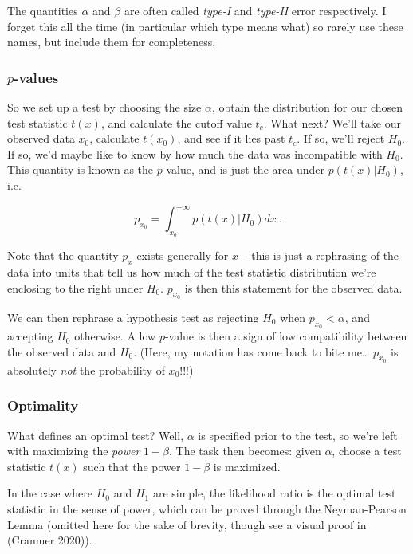 \documentclass[
  11pt,
  numbers=noendperiod]{book}
\begin{document}
The quantities \(\alpha\) and \(\beta\) are often called \emph{type-I}
and \emph{type-II} error respectively. I forget this all the time (in
particular which type means what) so rarely use these names, but include
them for completeness.

\hypertarget{p-values}{%
\subsubsection*{\texorpdfstring{\(p\)-values}{p-values}}\label{p-values}}

So we set up a test by choosing the size \(\alpha\), obtain the
distribution for our chosen test statistic \(t(x)\), and calculate the
cutoff value \(t_c\). What next? We'll take our observed data \(x_0\),
calculate \(t(x_0)\), and see if it lies past \(t_c\). If so, we'll
reject \(H_0\). If so, we'd maybe like to know by how much the data was
incompatible with \(H_0\). This quantity is known as the \(p\)-value,
and is just the area under \(p(t(x) | H_0)\), i.e.

\[ p_{x_0} = \int_{x_0}^{+\infty}p(t(x) | H_0) dx ~.\]

Note that the quantity \(p_{x}\) exists generally for \(x\) -- this is
just a rephrasing of the data into units that tell us how much of the
test statistic distribution we're enclosing to the right under \(H_0\).
\(p_{x_0}\) is then this statement for the observed data.

We can then rephrase a hypothesis test as rejecting \(H_0\) when
\(p_{x_0} < \alpha\), and accepting \(H_0\) otherwise. A low \(p\)-value
is then a sign of low compatibility between the observed data and
\(H_0\). (Here, my notation has come back to bite me\ldots{} \(p_{x_0}\)
is absolutely \emph{not} the probability of \(x_0\)!!!)

\hypertarget{optimality}{%
\subsubsection*{Optimality}\label{optimality}}

What defines an optimal test? Well, \(\alpha\) is specified prior to the
test, so we're left with maximizing the \emph{power} \(1-\beta\). The
task then becomes: given \(\alpha\), choose a test statistic \(t(x)\)
such that the power \(1-\beta\) is maximized.

In the case where \(H_0\) and \(H_1\) are simple, the likelihood ratio
is the optimal test statistic in the sense of power, which can be proved
through the Neyman-Pearson Lemma (omitted here for the sake of brevity,
though see a visual proof in (Cranmer 2020)).
\end{document}
